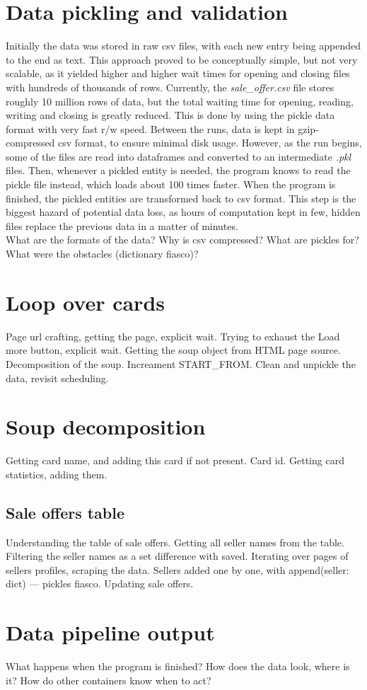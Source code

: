 \section{Data pickling and validation}
Initially the data was stored in raw csv files, with each new entry being appended to the end as text. This approach proved to be conceptually simple, but not very scalable, as it yielded higher and higher wait times for opening and closing files with hundreds of thousands of rows. Currently, the \textit{sale\_offer.csv} file stores roughly 10 million rows of data, but the total waiting time for opening, reading, writing and closing is greatly reduced. This is done by using the pickle data format with very fast r/w speed. Between the runs, data is kept in gzip-compressed csv format, to ensure minimal disk usage. However, as the run begins, some of the files are read into dataframes and converted to an intermediate \textit{.pkl} files. Then, whenever a pickled entity is needed, the program knows to read the pickle file instead, which loads about 100 times faster. When the program is finished, the pickled entities are transformed back to csv format. This step is the biggest hazard of potential data loss, as hours of computation kept in few, hidden files replace the previous data in a matter of minutes. \\
What are the formats of the data? Why is csv compressed?
What are pickles for? What were the obstacles (dictionary fiasco)?


\section{Loop over cards}
Page url crafting, getting the page, explicit wait.
Trying to exhaust the Load more button, explicit wait.
Getting the soup object from HTML page source.
Decomposition of the soup. Increament START\_FROM.
Clean and unpickle the data, revisit scheduling.


\section{Soup decomposition}
Getting card name, and adding this card if not present. Card id.
Getting card statistics, adding them.

\subsection{Sale offers table}
Understanding the table of sale offers.
Getting all seller names from the table.
Filtering the seller names as a set difference with saved.
Iterating over pages of sellers profiles, scraping the data.
Sellers added one by one, with append(seller: dict) --- pickles fiasco.
Updating sale offers.


\section{Data pipeline output}
What happens when the program is finished?
How does the data look, where is it?
How do other containers know when to act?

